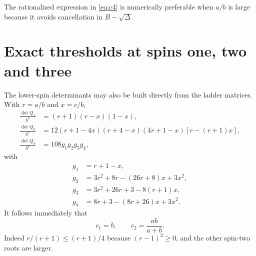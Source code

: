 \documentclass[11pt,a4paper]{article}
\begin{document}
The rationalized expression in \eqref{eq:c4} is numerically
preferable when $a/b$ is large because it avoids cancellation
in $B-\sqrt\Delta$.

\section{Exact thresholds at spins one, two and three}\label{sec:lower}
The lower-spin determinants may also be built directly from the
ladder matrices. With $r=a/b$ and $x=c/b$,
\begin{align}
\frac{\det Q_1}{b^3}
 &=(r+1)(r-x)(1-x),\label{eq:det1}\\
\frac{\det Q_2}{b^5}
 &=12(r+1-4x)(r+4-x)(4r+1-x)
       [r-(r+1)x],\label{eq:det2}\\
\frac{\det Q_3}{b^7}
 &=108g_1g_2g_3g_4,\label{eq:det3}
\end{align}
with
\begin{align}
g_1&=r+1-x,\\
g_2&=3r^2+8r-(26r+8)x+3x^2,\\
g_3&=3r^2+26r+3-8(r+1)x,\\
g_4&=8r+3-(8r+26)x+3x^2.
\end{align}
It follows immediately that
\begin{equation}\label{eq:c12}
\boxed{c_1=b,\qquad c_2=\frac{ab}{a+b}.}
\end{equation}
Indeed $r/(r+1)\leq(r+1)/4$ because $(r-1)^2\geq0$,
and the other spin-two roots are larger.
\end{document}
